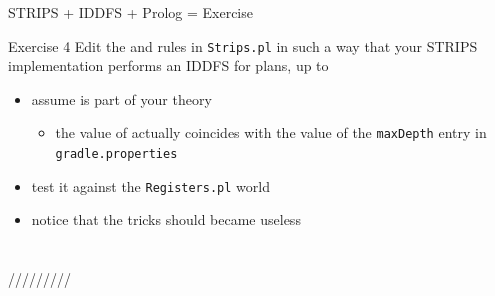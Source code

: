 \documentclass[presentation]{beamer}\mode<presentation>{\usetheme{AMSBolognaFC}}
\begin{document}
\begin{frame}[c]{STRIPS + IDDFS + Prolog = Exercise}

	\begin{block}{Exercise 4}
		Edit the  and  rules in \texttt{Strips.pl} in such a way that your STRIPS implementation performs an IDDFS for plans, up to 
		\begin{itemize}
			\item assume  is part of your theory
			\begin{itemize}
				\item the value of  actually coincides with the value of the \texttt{maxDepth} entry in \texttt{gradle.properties}
			\end{itemize}

			\item test it against the \texttt{Registers.pl} world

			\item notice that the  tricks should became useless
		\end{itemize}
	\end{block}


\end{frame}

\section*{}

\frame{\titlepage}

\section*{\refname}

\begin{frame}[c,noframenumbering]{\refname}
	\scriptsize
	\nocite{*}
	
	
\end{frame}
/////////

\end{document}
